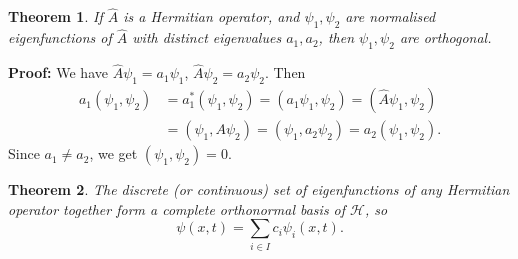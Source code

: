\documentclass[12pt]{article}
\newtheorem{theorem}{Theorem}[section]
\theoremstyle{definition}
\theoremstyle{remark}
\begin{document}
\begin{theorem}
	If $\hat A$ is a Hermitian operator, and $\psi_1, \psi_2$ are normalised eigenfunctions of $\hat A$ with distinct eigenvalues $a_1, a_2$, then $\psi_1, \psi_2$ are orthogonal.
\end{theorem}

\begin{adjustbox}{minipage = \columnwidth - 25.5pt, margin=1em, frame=1pt, margin=0em}
\textbf{Proof:} We have $\hat A \psi_1 = a_1\psi_1$, $\hat A \psi_2 = a_2 \psi_2$. Then
\begin{align*}
	a_1(\psi_1, \psi_2) &= a_1^{\ast}(\psi_1, \psi_2) = (a_1 \psi_1, \psi_2) = (\hat A\psi_1, \psi_2) \\
			    &= (\psi_1, A \psi_2) = (\psi_1, a_2 \psi_2) = a_2(\psi_1, \psi_2).
\end{align*}
Since $a_1 \neq a_2$, we get $(\psi_1, \psi_2) = 0$.
\end{adjustbox}

\begin{theorem}
	The discrete (or continuous) set of eigenfunctions of any Hermitian operator together form a complete orthonormal basis of $\mathcal{H}$, so
	\[
		\psi(x, t) = \sum_{i \in I}c_i \psi_i(x, t)
	.\]
\end{theorem}


\newpage

\printindex
\end{document}
